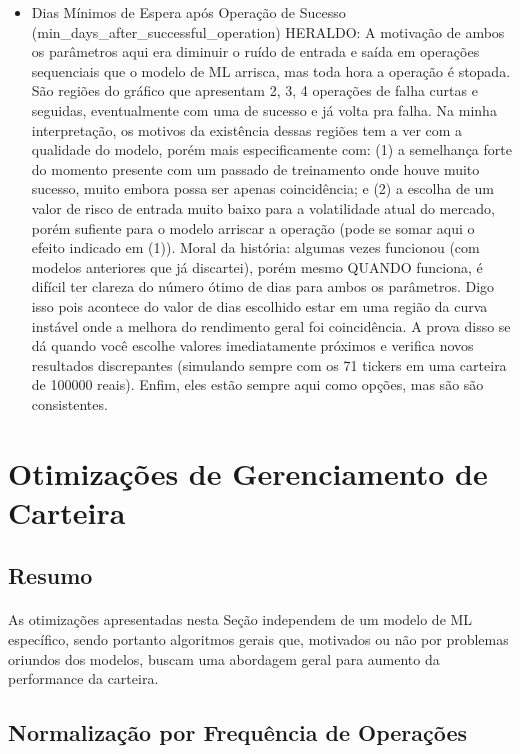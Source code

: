 \begin{itemize}
    \item Dias Mínimos de Espera após Operação de Sucesso (min\_days\_after\_successful\_operation)
    \color{red} HERALDO: A motivação de ambos os parâmetros aqui era diminuir o ruído de entrada e saída em operações sequenciais que o modelo de ML arrisca, mas toda hora a operação é stopada. São regiões do gráfico que apresentam 2, 3, 4 operações de falha curtas e seguidas, eventualmente com uma de sucesso e já volta pra falha. Na minha interpretação, os motivos da existência dessas regiões tem a ver com a qualidade do modelo, porém mais especificamente com: (1) a semelhança forte do momento presente com um passado de treinamento onde houve muito sucesso, muito embora possa ser apenas coincidência; e (2) a escolha de um valor de risco de entrada muito baixo para a volatilidade atual do mercado, porém sufiente para o modelo arriscar a operação (pode se somar aqui o efeito indicado em (1)). Moral da história: algumas vezes funcionou (com modelos anteriores que já discartei), porém mesmo QUANDO funciona, é difícil ter clareza do número ótimo de dias para ambos os parâmetros. Digo isso pois acontece do valor de dias escolhido estar em uma região da curva instável onde a melhora do rendimento geral foi coincidência. A prova disso se dá quando você escolhe valores imediatamente próximos e verifica novos resultados discrepantes (simulando sempre com os 71 tickers em uma carteira de 100000 reais). Enfim, eles estão sempre aqui como opções, mas são são consistentes. 
\end{itemize}



\section{Otimizações de Gerenciamento de Carteira}

\subsection{Resumo}

\paragraph{} As otimizações apresentadas nesta Seção independem de um modelo de ML específico, sendo portanto algoritmos gerais que, motivados ou não por problemas oriundos dos modelos, buscam uma abordagem geral para aumento da performance da carteira.

\subsection{Normalização por Frequência de Operações}
\label{freq_norm}
